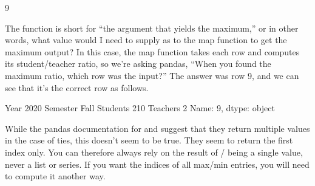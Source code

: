 \documentclass[letterpaper,10pt,english]{jupyterBook}
\begin{document}
\begin{sphinxVerbatim}[commandchars=\\\{\}]
 \PYG{p}{[}\PYG{p}{]}  \PYG{p}{[}\PYG{p}{]} 
\end{sphinxVerbatim}

\begin{sphinxVerbatim}[commandchars=\\\{\}]
9
\end{sphinxVerbatim}

\sphinxAtStartPar
The  function is short for “the argument that yields the maximum,” or in other words, what value would I need to supply as  to the map function to get the maximum output?  In this case, the map function takes each row and computes its student/teacher ratio, so we’re asking pandas, “When you found the maximum ratio, which row was the input?”  The answer was row 9, and we can see that it’s the correct row as follows.

\begin{sphinxVerbatim}[commandchars=\\\{\}]
\PYG{p}{[}\PYG{p}{]}
\end{sphinxVerbatim}

\begin{sphinxVerbatim}[commandchars=\\\{\}]
Year          2020
Semester      Fall
\PYGZsh{} Students     210
\PYGZsh{} Teachers       2
Name: 9, dtype: object
\end{sphinxVerbatim}

\sphinxAtStartPar
While the pandas documentation for  and  suggest that they return multiple values in the case of ties, this doesn’t seem to be true.  They seem to return the first index only.  You can therefore always rely on the result of / being a single value, never a list or series.  If you want the indices of all max/min entries, you will need to compute it another way.
\end{document}
